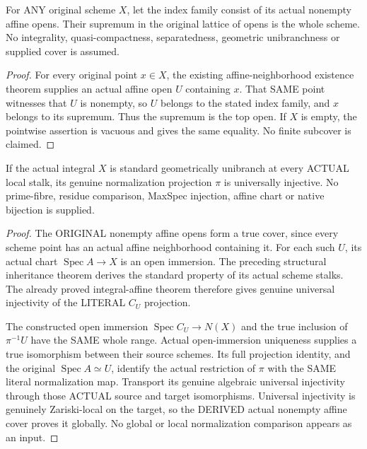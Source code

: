 \begin{lemma}
\label{scheme:actual-nonempty-affine-open-cover}
For ANY original scheme $X$, let the index family consist of its actual
nonempty affine opens. Their supremum in the original lattice of opens
is the whole scheme. No integrality, quasi-compactness, separatedness,
geometric unibranchness or supplied cover is assumed.
\leanok
\end{lemma}
\begin{proof}
For every original point $x\in X$, the existing affine-neighborhood
existence theorem supplies an actual affine open $U$ containing $x$.
That SAME point witnesses that $U$ is nonempty, so $U$ belongs to the
stated index family, and $x$ belongs to its supremum. Thus the supremum
is the top open. If $X$ is empty, the pointwise assertion is vacuous
and gives the same equality. No finite subcover is claimed.
\end{proof}

\begin{theorem}
\label{scheme:actual-integral-geometric-unibranch-normalization-radicial}
If the actual integral $X$ is standard geometrically unibranch
at every ACTUAL local stalk, its genuine normalization projection
$\pi$ is universally injective. No prime-fibre, residue comparison,
MaxSpec injection, affine chart or native bijection is supplied.
\leanok
\end{theorem}
\begin{proof}
The ORIGINAL nonempty affine opens form a true cover, since every
scheme point has an actual affine neighborhood containing it.
For each such $U$, its actual chart $\operatorname{Spec}A\to X$
is an open immersion. The preceding structural inheritance theorem
derives the standard property of its actual scheme stalks. The
already proved integral-affine theorem therefore gives genuine
universal injectivity of the LITERAL $C_U$ projection.

The constructed open immersion $\operatorname{Spec}C_U\to N(X)$
and the true inclusion of $\pi^{-1}U$ have the SAME whole range.
Actual open-immersion uniqueness supplies a true isomorphism
between their source schemes. Its full projection identity, and
the original $\operatorname{Spec}A\simeq U$, identify the actual
restriction of $\pi$ with the SAME literal normalization map.
Transport its genuine algebraic universal injectivity through
those ACTUAL source and target isomorphisms. Universal injectivity
is genuinely Zariski-local on the target, so the DERIVED actual
nonempty affine cover proves it globally. No global or local
normalization comparison appears as an input.
\end{proof}

